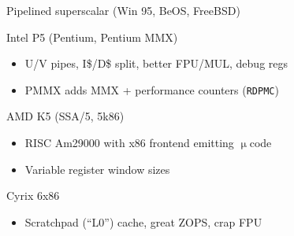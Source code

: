\documentclass[mathserif,xcolor={dvipsnames,table}]{beamer}
\begin{document}
\begin{frame}[t]{Pipelined superscalar (Win 95, BeOS, FreeBSD)}
\begin{block}{Intel P5 (Pentium, Pentium MMX)}
\begin{itemize}
\item U/V pipes, I\$/D\$ split, better FPU/MUL, debug regs
\item PMMX adds MMX + performance counters (\texttt{RDPMC})
\end{itemize}
\end{block}
\begin{block}{AMD K5 (SSA/5, 5k86)}
\begin{itemize}
\item RISC Am29000 with x86 frontend emitting $\upmu$code
\item Variable register window sizes
\end{itemize}
\end{block}
\begin{block}{Cyrix 6x86}
\begin{itemize}
\item Scratchpad (``L0'') cache, great ZOPS, crap FPU
\end{itemize}
\end{block}
\vfill
\begin{center}
\end{center}
\end{frame}
\end{document}
